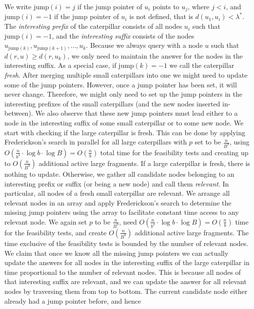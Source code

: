 \documentclass[a4paper,UKenglish]{lipics-v2016}
\theoremstyle{plain}
\newcommand{\jump}{\text{jump}}
\begin{document}
We write $\jump(i)=j$ if the jump pointer of $u_{i}$ points to $u_{j}$, where $j<i$, and $\jump(i)=-1$
if the jump pointer of $u_{i}$ is not defined, that is $d(u_{1},u_{i})<\lambda^{*}$.
The {\em interesting prefix} of the caterpillar consists of all nodes $u_{i}$ such that $\jump(i)=-1$,
and the {\em interesting suffix} consists of the nodes $u_{\jump(k)},u_{\jump(k+1)},\ldots,u_{k}$.
Because we always query with a node $u$ such that $d(r,u) \geq d(r,u_{k})$, we only
need to maintain the answer for the nodes in the interesting suffix. As a special case,
if $\jump(k)=-1$ we call the caterpillar \emph{fresh}.
After merging multiple small caterpillars into one we might need to update some of the jump pointers.
However, once a jump pointer has been set, it will never change. Therefore, we might only
need to set up the jump pointers in the interesting prefixes of the small caterpillars
(and the new nodes inserted in-between). We also observe that these new jump pointers
must lead either to a node in the interesting suffix of some small caterpillar
or to some new node. We start with checking if the large caterpillar is fresh. This can be
done by applying Frederickson's search in parallel for all large caterpillars with $p$ set to
be $\frac{n}{B^{9}}$, using $O(\frac{n}{b^{4}}\cdot \log b \cdot \log B)=O(\frac{n}{b})$
total time for the feasibility tests and creating up to $O(\frac{n}{B^{9}})$ additional active large
fragments. If a large caterpillar is fresh, there is nothing to update. Otherwise,
we gather all candidate nodes belonging to
an interesting prefix or suffix (or being a new node) and call them \emph{relevant}. In particular,
all nodes of a fresh small caterpillar are relevant.
We arrange all relevant nodes in an array and apply Frederickson's search to determine the missing jump
pointers using the array to facilitate constant time access to any relevant node. We again
set $p$ to be $\frac{n}{B^{9}}$, need $O(\frac{n}{b^{4}}\cdot \log b \cdot \log B)=O(\frac{n}{b})$
time for the feasibility tests, and create $O(\frac{n}{B^{9}})$ additional active large fragments.
The time exclusive of the feasibility tests is bounded by the number of relevant nodes.
We claim that once we know all the missing jump pointers we can actually update the answers
for all nodes in the interesting suffix of the large caterpillar in time proportional to the
number of relevant nodes. This is because all nodes of that interesting suffix are
relevant, and we can update the answer for all relevant nodes by traversing them from top
to bottom. The current candidate node either already had a jump pointer before, and hence
\end{document}
